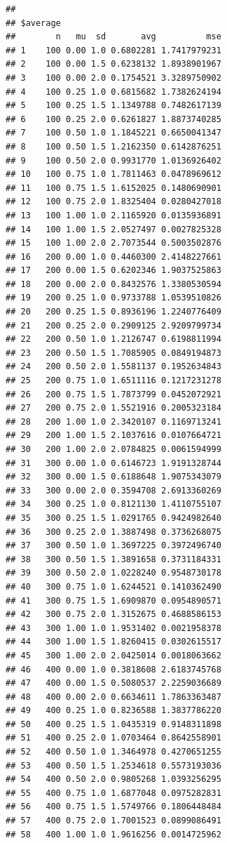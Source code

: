 \documentclass[11pt,a4paper]{article}
\begin{document}
\begin{verbatim}
## 
## $average
##        n   mu  sd       avg          mse
## 1    100 0.00 1.0 0.6802281 1.7417979231
## 2    100 0.00 1.5 0.6238132 1.8938901967
## 3    100 0.00 2.0 0.1754521 3.3289750902
## 4    100 0.25 1.0 0.6815682 1.7382624194
## 5    100 0.25 1.5 1.1349788 0.7482617139
## 6    100 0.25 2.0 0.6261827 1.8873740285
## 7    100 0.50 1.0 1.1845221 0.6650041347
## 8    100 0.50 1.5 1.2162350 0.6142876251
## 9    100 0.50 2.0 0.9931770 1.0136926402
## 10   100 0.75 1.0 1.7811463 0.0478969612
## 11   100 0.75 1.5 1.6152025 0.1480690901
## 12   100 0.75 2.0 1.8325404 0.0280427018
## 13   100 1.00 1.0 2.1165920 0.0135936891
## 14   100 1.00 1.5 2.0527497 0.0027825328
## 15   100 1.00 2.0 2.7073544 0.5003502876
## 16   200 0.00 1.0 0.4460300 2.4148227661
## 17   200 0.00 1.5 0.6202346 1.9037525863
## 18   200 0.00 2.0 0.8432576 1.3380530594
## 19   200 0.25 1.0 0.9733788 1.0539510826
## 20   200 0.25 1.5 0.8936196 1.2240776409
## 21   200 0.25 2.0 0.2909125 2.9209799734
## 22   200 0.50 1.0 1.2126747 0.6198811994
## 23   200 0.50 1.5 1.7085905 0.0849194873
## 24   200 0.50 2.0 1.5581137 0.1952634843
## 25   200 0.75 1.0 1.6511116 0.1217231278
## 26   200 0.75 1.5 1.7873799 0.0452072921
## 27   200 0.75 2.0 1.5521916 0.2005323184
## 28   200 1.00 1.0 2.3420107 0.1169713241
## 29   200 1.00 1.5 2.1037616 0.0107664721
## 30   200 1.00 2.0 2.0784825 0.0061594999
## 31   300 0.00 1.0 0.6146723 1.9191328744
## 32   300 0.00 1.5 0.6188648 1.9075343079
## 33   300 0.00 2.0 0.3594708 2.6913360269
## 34   300 0.25 1.0 0.8121130 1.4110755107
## 35   300 0.25 1.5 1.0291765 0.9424982640
## 36   300 0.25 2.0 1.3887498 0.3736268075
## 37   300 0.50 1.0 1.3697225 0.3972496740
## 38   300 0.50 1.5 1.3891658 0.3731184331
## 39   300 0.50 2.0 1.0228240 0.9548730178
## 40   300 0.75 1.0 1.6244521 0.1410362490
## 41   300 0.75 1.5 1.6909870 0.0954890571
## 42   300 0.75 2.0 1.3152675 0.4688586153
## 43   300 1.00 1.0 1.9531402 0.0021958378
## 44   300 1.00 1.5 1.8260415 0.0302615517
## 45   300 1.00 2.0 2.0425014 0.0018063662
## 46   400 0.00 1.0 0.3818608 2.6183745768
## 47   400 0.00 1.5 0.5080537 2.2259036689
## 48   400 0.00 2.0 0.6634611 1.7863363487
## 49   400 0.25 1.0 0.8236588 1.3837786220
## 50   400 0.25 1.5 1.0435319 0.9148311898
## 51   400 0.25 2.0 1.0703464 0.8642558901
## 52   400 0.50 1.0 1.3464978 0.4270651255
## 53   400 0.50 1.5 1.2534618 0.5573193036
## 54   400 0.50 2.0 0.9805268 1.0393256295
## 55   400 0.75 1.0 1.6877048 0.0975282831
## 56   400 0.75 1.5 1.5749766 0.1806448484
## 57   400 0.75 2.0 1.7001523 0.0899086491
## 58   400 1.00 1.0 1.9616256 0.0014725962

\end{verbatim}
\end{document}
